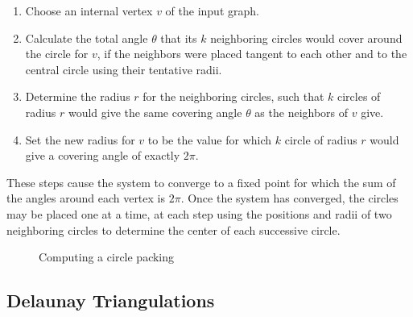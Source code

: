 \documentclass[11pt]{article}
\theoremstyle{definition}
\begin{document}
	\begin{enumerate}
		\item Choose an internal vertex $v$ of the input graph.
		\item Calculate the total angle $\theta$ that its $k$ neighboring circles would cover around the circle for $v$, if the neighbors were placed tangent to each other and to the central circle using their tentative radii.
		\item Determine the radius $r$ for the neighboring circles, such that $k$ circles of radius $r$ would give the same covering angle $\theta$ as the neighbors of $v$ give.
		\item Set the new radius for $v$ to be the value for which $k$ circle of radius $r$ would give a covering angle of exactly $2\pi$.
	\end{enumerate}
	
	These steps cause the system to converge to a fixed point for which the sum of the angles around each vertex is $2\pi$. 
	Once the system has converged, the circles may be placed one at a time, at each step using the positions and radii of two neighboring circles to determine the center of each successive circle.

	\begin{figure}%
    		\centering
    		\qquad
    		\caption{Computing a circle packing}%
    		\label{fig:inout}%
	\end{figure}

\subsection{Delaunay Triangulations}
\end{document}
